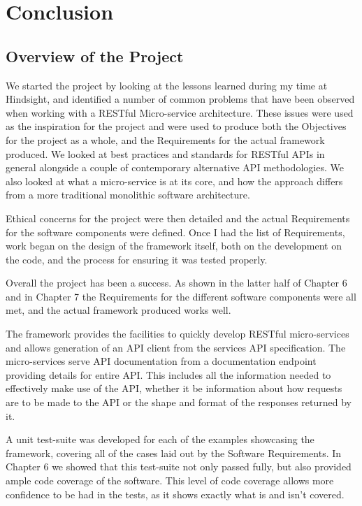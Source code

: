 \chapter{Conclusion}
\section{Overview of the Project}

We started the project by looking at the lessons learned during my time at Hindsight, and identified a number of common problems that have been observed when working with a RESTful Micro-service architecture. These issues were used as the inspiration for the project and were used to produce both the Objectives for the project as a whole, and the Requirements for the actual framework produced. We looked at best practices and standards for RESTful APIs in general alongside a couple of contemporary alternative API methodologies. We also looked at what a micro-service is at its core, and how the approach differs from a more traditional monolithic software architecture.

Ethical concerns for the project were then detailed and the actual Requirements for the software components were defined. Once I had the list of Requirements, work began on the design of the framework itself, both on the development on the code, and the process for ensuring it was tested properly.

Overall the project has been a success. As shown in the latter half of Chapter 6 and in Chapter 7 the Requirements for the different software components were all met, and the actual framework produced works well. 

The framework provides the facilities to quickly develop RESTful micro-services and allows generation of an API client from the services API specification. The micro-services serve API documentation from a documentation endpoint providing details for entire API. This includes all the information needed to effectively make use of the API, whether it be information about how requests are to be made to the API or the shape and format of the responses returned by it.

A unit test-suite was developed for each of the examples showcasing the framework, covering all of the cases laid out by the Software Requirements. In Chapter 6 we showed that this test-suite not only passed fully, but also provided ample code coverage of the software. This level of code coverage allows more confidence to be had in the tests, as it shows exactly what is and isn't covered.

